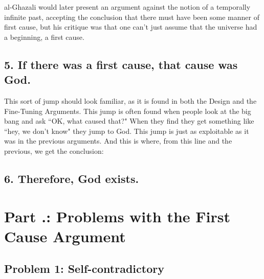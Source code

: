 al-Ghazali would later present an argument against the notion of a temporally infinite past, accepting the conclusion that there must have been some manner of first cause, but his critique was that one can't just assume that the universe had a beginning, a first cause.

\subsection{5. If there was a first cause, that cause was God.}

This sort of jump should look familiar, as it is found in both the Design and the Fine-Tuning Arguments. This jump is often found when people look at the big bang and ask ``OK, what caused that?" When they find they get something like ``hey, we don't know" they jump to God. This jump is just as exploitable as it was in the previous arguments. And this is where, from this line and the previous, we get the conclusion:

\subsection{6. Therefore, God exists.}

\section{Part \thechapcount.\theseccount: Problems with the First Cause Argument}
\subsection{Problem 1: Self-contradictory}

